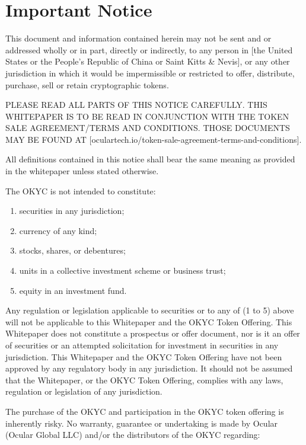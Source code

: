 \documentclass[12pt]{article}
\begin{document}
\tableofcontents

\pagebreak

\section{Important Notice}
This document and information contained herein may not be sent and or addressed wholly or in part, directly or indirectly, to any person in [the United States or the People’s Republic of China or Saint Kitts \& Nevis], or any other jurisdiction in which it would be impermissible or restricted to offer, distribute, purchase, sell or retain cryptographic tokens.

PLEASE READ ALL PARTS OF THIS NOTICE CAREFULLY. THIS WHITEPAPER IS TO BE READ IN CONJUNCTION WITH THE TOKEN SALE AGREEMENT/TERMS AND CONDITIONS. THOSE DOCUMENTS MAY BE FOUND AT [oculartech.io/token-sale-agreement-terms-and-conditions].

All definitions contained in this notice shall bear the same meaning as provided in the whitepaper unless stated otherwise.

The OKYC is not intended to constitute:
\begin{enumerate}
\item securities in any jurisdiction;
\item currency of any kind;
\item stocks, shares, or debentures;
\item units in a collective investment scheme or business trust;
\item equity in an investment fund.
\end{enumerate}

Any regulation or legislation applicable to securities or to any of (1 to 5) above will not be applicable to this Whitepaper and the OKYC Token Offering. This Whitepaper does not constitute a prospectus or offer document, nor is it an offer of securities or an attempted solicitation for investment in securities in any jurisdiction. This Whitepaper and the OKYC Token Offering have not been approved by any regulatory body in any jurisdiction. It should not be assumed that the Whitepaper, or the OKYC Token Offering, complies with any laws, regulation or legislation of any jurisdiction.

The purchase of the OKYC and participation in the OKYC token offering is inherently risky. No warranty, guarantee or undertaking is made by Ocular (Ocular Global LLC) and/or the distributors of the OKYC regarding:
\end{document}
